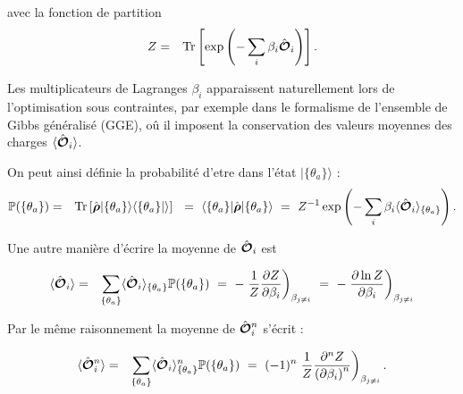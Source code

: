 avec la fonction de partition 
\begin{eqnarray}
	Z & = & \mathrm{Tr} \left [ \exp \left ( - \sum_i \beta_i \hat{\bm{\mathcal{O}}}_i \right ) \right ]. 	
\end{eqnarray}

Les multiplicateurs de Lagranges $\beta_i$ apparaissent naturellement lors de l'optimisation sous contraintes, par exemple dans le formalisme de l'ensemble de Gibbs généralisé (GGE), oû il imposent la conservation des valeurs moyennes des charges $\langle \hat{\bm{\mathcal{O}}}_i \rangle $.

On peut ainsi définie la probabilité d'etre dans l'état $\vert \{ \theta_a \} \rangle$ :
\begin{eqnarray}
	\mathbb{P} ( \{ \theta_a \} ) & = & \mathrm{Tr} \left [\operator{\rho} \vert \{ \theta_a \} \rangle \langle \{ \theta_a \} \vert \rangle \right ] ~=~  \langle \{ \theta_a \} \vert	\operator{\rho} \vert \{ \theta_a \} \rangle ~=~ Z^{-1} \exp \left (- \sum_i \beta_i \langle\operator{\mathcal{O}}_i\rangle_{\{\theta_a\}} \right ) .
\end{eqnarray}

Une autre manière d'écrire la moyenne de $\hat{\bm{\mathcal{O}}}_i$ est 

\begin{eqnarray}
	\langle \hat{\bm{\mathcal{O}}}_i \rangle &= & \sum_{\{ \theta_a\}} \langle\hat{\bm{\mathcal{O}}}_i\rangle_{\{\theta_a\}} \mathbb{P} ( \{ \theta_a \} ) ~=~- \left. \frac{1}{Z} \frac{\partial Z}{\partial \beta_i} \right )_{\beta_{j \neq i }} ~=~ - 	\left . \frac{\partial  \ln Z}{\partial \beta_i} \right )_{\beta_{j \neq i }}	
\end{eqnarray}

Par le même raisonnement la moyenne de $\hat{\bm{\mathcal{O}}}_i^n$ s'écrit :

\begin{eqnarray}
	\langle \hat{\bm{\mathcal{O}}}_i^n \rangle &= & \sum_{\{ \theta_a\}} \langle\hat{\bm{\mathcal{O}}}_i\rangle_{\{\theta_a\}}^n \mathbb{P} ( \{ \theta_a \} ) ~=~ (-1)^n \left. \frac{1}{Z} \frac{\partial^n Z}{{(\partial \beta_i)}^n} \right )_{\beta_{j \neq i }} .	
\end{eqnarray}


